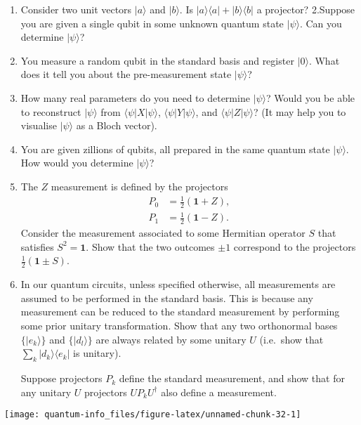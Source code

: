 \documentclass[fleqn]{article}
\begin{document}
\begin{enumerate}
\def\labelenumi{\arabic{enumi}.}
\item
  Consider two unit vectors \(|a\rangle\) and \(|b\rangle\).
  Is \(|a\rangle\langle a|+|b\rangle\langle b|\) a projector?
  2.Suppose you are given a single qubit in some unknown quantum state \(|\psi\rangle\).
  Can you determine \(|\psi\rangle\)?
\item
  You measure a random qubit in the standard basis and register \(|0\rangle\).
  What does it tell you about the pre-measurement state \(|\psi\rangle\)?
\item
  How many real parameters do you need to determine \(|\psi\rangle\)?
  Would you be able to reconstruct \(|\psi\rangle\) from \(\langle\psi|X|\psi\rangle\), \(\langle\psi|Y|\psi\rangle\), and \(\langle\psi|Z|\psi\rangle\)?
  (It may help you to visualise \(|\psi\rangle\) as a Bloch vector).
\item
  You are given zillions of qubits, all prepared in the same quantum state \(|\psi\rangle\).
  How would you determine \(|\psi\rangle\)?
\item
  The \(Z\) measurement is defined by the projectors
  \[
     \begin{aligned}
       P_0 &= \frac12(\mathbf{1}+ Z),
     \\P_1 &= \frac12(\mathbf{1}- Z).
     \end{aligned}
   \]
  Consider the measurement associated to some Hermitian operator \(S\) that satisfies \(S^2=\mathbf{1}\).
  Show that the two outcomes \(\pm 1\) correspond to the projectors \(\frac12(\mathbf{1}\pm S)\).
\item
  In our quantum circuits, unless specified otherwise, all measurements are assumed to be performed in the standard basis.
  This is because any measurement can be reduced to the standard measurement by performing some prior unitary transformation.
  Show that any two orthonormal bases \(\{|e_k\rangle\}\) and \(\{|d_l\rangle\}\) are always related by some unitary \(U\) (i.e.~show that \(\sum_k |d_k\rangle\langle e_k|\) is unitary).

  Suppose projectors \(P_k\) define the standard measurement, and show that for any unitary \(U\) projectors \(UP_kU^\dagger\) also define a measurement.
\end{enumerate}

\begin{center}\texttt{[image: quantum-info\_files/figure-latex/unnamed-chunk-32-1]} \end{center}
\end{document}

